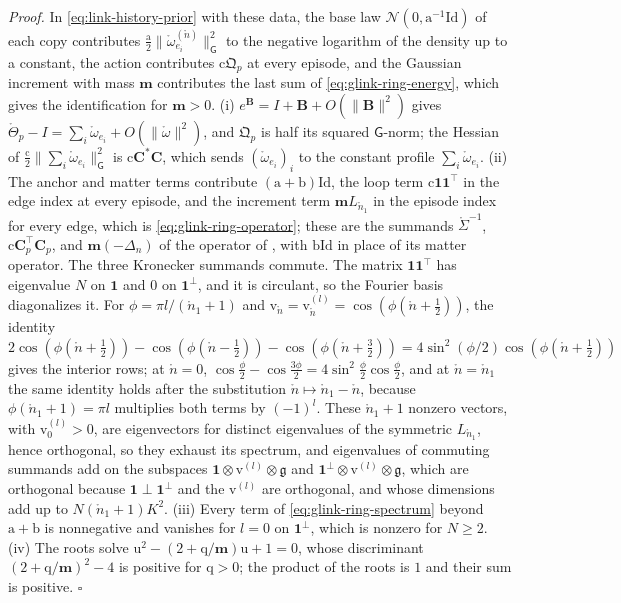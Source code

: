 \noindent\emph{Proof.}
In \eqref{eq:link-history-prior} with these data, the base law \(\mathcal N(0,\mathrm a^{-1}\mathrm{Id})\) of each copy
contributes \(\tfrac{\mathrm a}2\lVert\mathring\omega^{(\mathring n)}_{e_i}\rVert_{\mathsf G}^2\) to the negative
logarithm of the density up to a constant, the action contributes \(\mathrm c\mathfrak Q_p\) at every episode,
and the Gaussian increment with mass \(\mathbf m\) contributes the last sum of \eqref{eq:glink-ring-energy},
which gives the identification for \(\mathbf m>0\).
(i) \(e^{\mathbf B}=I+\mathbf B+O(\lVert\mathbf B\rVert^2)\) gives
\(\mathring\Theta_p-I=\sum_i\mathring\omega_{e_i}+O(\lVert\mathring\omega\rVert^2)\), and \(\mathfrak Q_p\) is
half its squared \(\mathsf G\)-norm; the Hessian of
\(\tfrac{\mathrm c}2\lVert\sum_i\mathring\omega_{e_i}\rVert_{\mathsf G}^2\) is \(\mathrm c\mathbf C^*\mathbf C\), which
sends \((\mathring\omega_{e_i})_i\) to the constant profile \(\sum_i\mathring\omega_{e_i}\). (ii) The anchor
and matter terms contribute \((\mathrm a+\mathrm b)\mathrm{Id}\), the loop term
\(\mathrm c\mathbf 1\mathbf 1^\top\) in the edge index at every episode, and the increment term
\(\mathbf mL_{\mathring n_1}\) in the episode index for every edge, which is
\eqref{eq:glink-ring-operator}; these are the summands \(\mathring\Sigma^{-1}\), \(\mathrm c\mathbf C_p^\top\mathbf C_p\),
and \(\mathbf m(-\Delta_n)\) of the operator of , with \(\mathrm b\mathrm{Id}\) in
place of its matter operator. The three Kronecker summands commute. The matrix \(\mathbf 1\mathbf 1^\top\)
has eigenvalue \(N\) on \(\mathbf 1\) and \(0\) on \(\mathbf 1^\perp\), and it is circulant, so the Fourier
basis diagonalizes it. For \(\phi=\pi l/(\mathring n_1+1)\) and
\(\mathrm v_{\mathring n}=\mathrm v^{(l)}_{\mathring n}=\cos(\phi(\mathring n+\tfrac12))\), the identity
\(2\cos(\phi(\mathring n+\tfrac12))-\cos(\phi(\mathring n-\tfrac12))-\cos(\phi(\mathring n+\tfrac32))
=4\sin^2(\phi/2)\cos(\phi(\mathring n+\tfrac12))\) gives the interior rows; at \(\mathring n=0\),
\(\cos\tfrac\phi2-\cos\tfrac{3\phi}2=4\sin^2\tfrac\phi2\cos\tfrac\phi2\), and at
\(\mathring n=\mathring n_1\) the same identity holds after the substitution
\(\mathring n\mapsto\mathring n_1-\mathring n\), because \(\phi(\mathring n_1+1)=\pi l\) multiplies both
terms by \((-1)^l\). These \(\mathring n_1+1\) nonzero vectors, with \(\mathrm v^{(l)}_0>0\), are eigenvectors
for distinct eigenvalues of the symmetric \(L_{\mathring n_1}\), hence orthogonal, so they exhaust its
spectrum, and eigenvalues of commuting summands add on the subspaces
\(\mathbf 1\otimes\mathrm v^{(l)}\otimes\mathfrak g\) and \(\mathbf 1^\perp\otimes\mathrm v^{(l)}\otimes\mathfrak g\), which are
orthogonal because \(\mathbf 1\perp\mathbf 1^\perp\) and the \(\mathrm v^{(l)}\) are orthogonal, and whose
dimensions add up to \(N(\mathring n_1+1)K^2\). (iii) Every term of
\eqref{eq:glink-ring-spectrum} beyond \(\mathrm a+\mathrm b\) is nonnegative and vanishes for
\(l=0\) on \(\mathbf 1^\perp\), which is nonzero for \(N\geq2\). (iv) The roots solve
\(\mathrm u^2-(2+\mathrm q/\mathbf m)\mathrm u+1=0\), whose discriminant \((2+\mathrm q/\mathbf m)^2-4\) is positive for
\(\mathrm q>0\); the product of the roots is \(1\) and their sum is positive. \hfill$\square$

